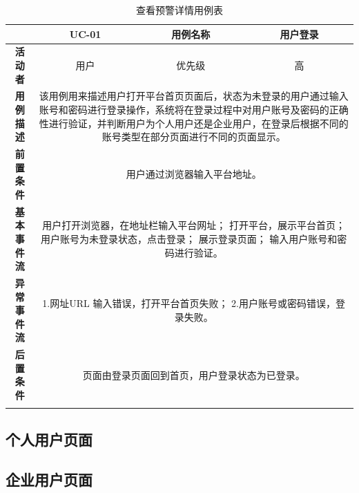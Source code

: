 \begin{longtable}[c]{c|ccc}
	\caption{查看预警详情用例表}
	\label{tab:tab10}\\
	\shline
	\multicolumn{1}{c|}{\textbf{用例编号}} & \multicolumn{1}{c|}{UC-01} & \multicolumn{1}{c|}{用例名称} &  用户登录\\ \hline
	\endhead
	\multicolumn{1}{c|}{\textbf{活动者}} & \multicolumn{1}{c|}{用户} & \multicolumn{1}{c|}{优先级} &高  \\ \hline
	\textbf{用例描述} & \multicolumn{3}{p{12cm}}{该用例用来描述用户打开平台首页页面后，状态为未登录的用户通过输入账号和密码进行登录操作，系统将在登录过程中对用户账号及密码的正确性进行验证，并判断用户为个人用户还是企业用户，在登录后根据不同的账号类型在部分页面进行不同的页面显示。} \\ \hline
	\textbf{前置条件}& \multicolumn{3}{p{12cm}}{用户通过浏览器输入平台地址。} \\ \hline
	\textbf{基本事件流}& \multicolumn{3}{p{12cm}}{用户打开浏览器，在地址栏输入平台网址；\newline
		打开平台，展示平台首页；\newline
		用户账号为未登录状态，点击登录；\newline
		展示登录页面；\newline
		输入用户账号和密码进行验证。} \\ \hline
	\textbf{异常事件流}& \multicolumn{3}{p{12cm}}{1.网址URL 输入错误，打开平台首页失败；\newline
		2.用户账号或密码错误，登录失败。
	} \\ \hline
	\textbf{后置条件}& \multicolumn{3}{p{12cm}}{页面由登录页面回到首页，用户登录状态为已登录。} \\ \shline
\end{longtable}

\subsection{个人用户页面}

\subsection{企业用户页面}